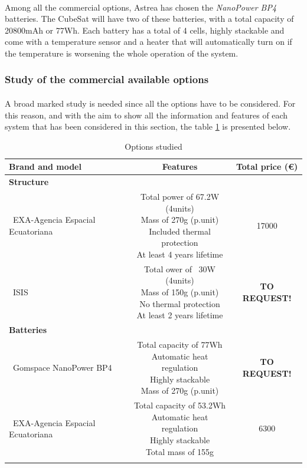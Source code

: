 \paragraph{}Among all the commercial options, Astrea has chosen the \textit{NanoPower BP4} batteries. The CubeSat will have two of these batteries, with a total capacity of 20800mAh or 77Wh. Each battery has a total of 4 cells, highly stackable and come with a temperature sensor and a heater that will automatically turn on if the temperature is worsening the whole operation of the system. 

\subsubsection{Study of the commercial available options}
\paragraph{}A broad marked study is needed since all the options have to be considered. For this reason, and with the aim to show all the information and features of each system that has been considered in this section, the table \ref{epsoptions} is presented below.

\begin{longtable}{| l | c | c | }
\hline
\rowcolor[gray]{0.80}	\textbf{Brand and model} &  \textbf{Features}     & \textbf{Total price (\euro)}   \\
\hline
\endfirsthead

\rowcolor[gray]{0.85} \textbf{Structure} &  &  \\
	   ~EXA-Agencia Espacial Ecuatoriana & \makecell{Total power of 67.2W (4units)\\ Mass of 270g (p.unit) \\ Included thermal protection \\At least 4 years lifetime} & 17000 \\
	   \hline
	   ~ISIS & \makecell{Total ower of ~30W (4units) \\ Mass of 150g (p.unit) \\ No thermal protection \\At least 2 years lifetime} & \textbf{TO REQUEST!} \\
	   \hline
\rowcolor[gray]{0.85} \textbf{Batteries} &  &  \\
	   ~Gomspace NanoPower BP4 & \makecell{Total capacity of 77Wh \\ Automatic heat regulation \\ Highly stackable \\ Mass of 270g (p.unit)} & \textbf{TO REQUEST!} \\
	\hline
	~EXA-Agencia Espacial Ecuatoriana & \makecell{Total capacity of 53.2Wh \\ Automatic heat regulation \\ Highly stackable \\ Total mass of 155g} & 6300 \\
	\hline
	
\caption{Options studied}
\label{epsoptions}
\end{longtable}

